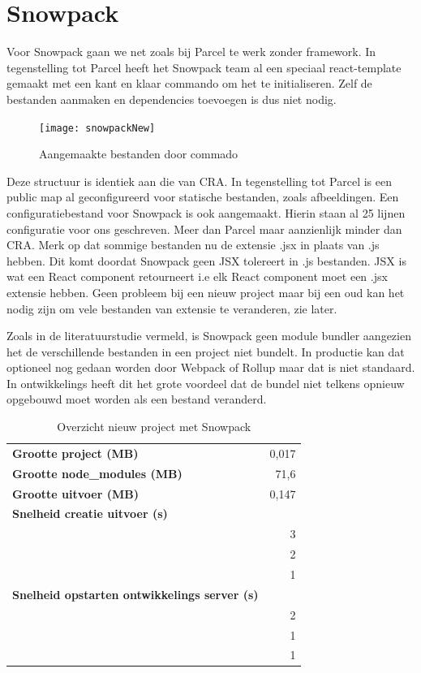 \section{Snowpack}
Voor Snowpack gaan we net zoals bij Parcel te werk zonder framework. In tegenstelling tot Parcel heeft het Snowpack team al een speciaal react-template gemaakt met een kant en klaar commando om het te initialiseren. Zelf de bestanden aanmaken en dependencies toevoegen is dus niet nodig.


\begin{figure}[h]
   \texttt{[image: snowpackNew]}
       \centering
       \caption[Aangemaakte bestanden door Snowpack commando]{Aangemaakte bestanden door commado}
   \end{figure}

Deze structuur is identiek aan die van CRA. In tegenstelling tot Parcel is een public map al geconfigureerd voor statische bestanden, zoals afbeeldingen. Een configuratiebestand voor Snowpack is ook aangemaakt. Hierin staan al 25 lijnen configuratie voor ons geschreven. Meer dan Parcel maar aanzienlijk minder dan CRA. Merk op dat sommige bestanden nu de extensie .jsx in plaats van .js hebben. Dit komt doordat Snowpack geen JSX tolereert in .js bestanden. JSX is wat een React component retourneert i.e elk React component moet een .jsx extensie hebben. Geen probleem bij een nieuw project maar bij een oud kan het nodig zijn om vele bestanden van extensie te veranderen, zie later.

Zoals in de literatuurstudie vermeld, is Snowpack geen module bundler aangezien het de verschillende bestanden in een project niet bundelt. In productie kan dat optioneel nog gedaan worden door Webpack of Rollup maar dat is niet standaard. In ontwikkelings heeft dit het grote voordeel dat de bundel niet telkens opnieuw opgebouwd moet worden als een bestand veranderd.

\begin{table}[h]
   \centering
   \begin{tabular}{lr}
   \textbf{Grootte project (MB)} & 0,017 \\
   \textbf{Grootte node\_modules (MB)} & 71,6 \\
   \textbf{Grootte uitvoer (MB)} & 0,147 \\
   \textbf{Snelheid creatie uitvoer (s)} &  \\
   \textbf{} & 3 \\
   \textbf{} & 2 \\
   \textbf{} & 1 \\
   \textbf{Snelheid opstarten ontwikkelings server (s)} &  \\
   \textbf{} & 2 \\
   \textbf{} & 1 \\
   \textbf{} & 1
   \end{tabular}
   \caption{Overzicht nieuw project met Snowpack}
   \end{table}

